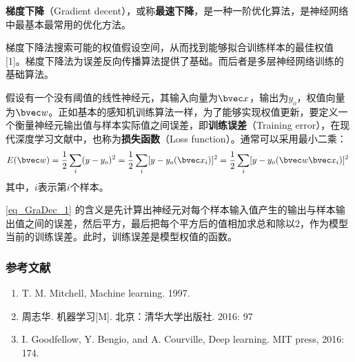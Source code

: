 
\textbf{梯度下降}（Gradient decent），或称\textbf{最速下降}，是一种一阶优化算法，是神经网络中最基本最常用的优化方法。

梯度下降法搜索可能的权值假设空间，从而找到能够拟合训练样本的最佳权值 [1]。梯度下降法为误差反向传播算法提供了基础。而后者是多层神经网络训练的基础算法。

假设有一个没有阈值的线性神经元，其输入向量为$\bvec x$，输出为$y_o$，权值向量为$\bvec w$。正如基本的感知机训练算法一样，为了能够实现权值更新，要定义一个衡量神经元输出值与样本实际值之间误差，即\textbf{训练误差}（Training error），在现代深度学习文献中，也称为\textbf{损失函数}（Loss function）。通常可以采用最小二乘：
\begin{equation}\label{eq_GraDec_1}
E(\bvec w)=\frac{1}{2}\sum_i(y-y_o)^2=\frac{1}{2}\sum_i[y-y_o(\bvec x_i)]^2=\frac{1}{2}\sum_i[y-y_o(\bvec w \bvec x_i)]^2~
\end{equation}
其中，$i$表示第$i$个样本。

\autoref{eq_GraDec_1} 的含义是先计算出神经元对每个样本输入值产生的输出与样本输出值之间的误差，然后平方，最后把每个平方后的值相加求总和除以$2$，作为模型当前的训练误差。此时，训练误差是模型权值的函数。




\subsubsection{参考文献}
\begin{enumerate}
\item T. M. Mitchell, Machine learning. 1997.
\item 周志华. 机器学习[M]. 北京：清华大学出版社. 2016: 97
\item I. Goodfellow, Y. Bengio, and A. Courville, Deep learning. MIT press, 2016: 174.
\end{enumerate}